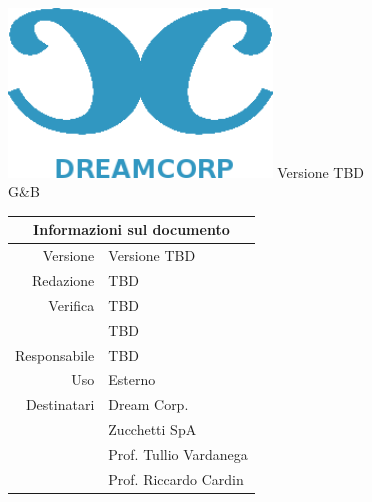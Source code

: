 \documentclass[12pt]{article}
\title{\myfont{Glossario}}
\author{Dream Corp.}
\date{ \myfont 05-12-2018}
\newcommand{\red}{TBD}
\newcommand{\verp}{TBD}
\newcommand{\vers}{TBD}
\newcommand{\res}{TBD}
\newcommand{\version}{Versione TBD}
\newcommand{\use}{Esterno}
\begin{document}
    
\maketitle
\begin{center}
	\includegraphics[width = 70mm]{../../logo.png}\newline
	\huge \version 
	\\G\&B
	
	\begin{table}[h!]
		\centering
		\begin{tabular}{r|l}
			\multicolumn{2}{c}{Informazioni sul documento}\\
			\hline
			Versione & \version \\
			Redazione & \red \\
			Verifica & \verp\\
			& \vers\\
			Responsabile & \res\\
			Uso & \use\\
			Destinatari & Dream Corp. \\
			& Zucchetti SpA\\
			& Prof. Tullio Vardanega\\
			& Prof. Riccardo Cardin\\
		\end{tabular}
	\end{table}
	
\end{center}
\newpage

    
    \glsaddall

    \printglossary[title=Glossario,toctitle=Glossario]
\end{document}
